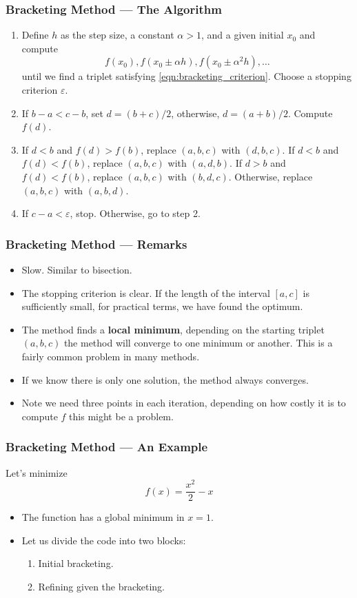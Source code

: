 \documentclass[11pt,xcolor={svgnames},aspectratio=169,usepdftitle=false]{beamer}
\begin{document}
\begin{frame}
  \frametitle{Bracketing Method --- The Algorithm}
\begin{enumerate}
  \item Define $h$ as the step size, a constant $\alpha > 1$, and a given initial $x_0$ and compute
  \[
  f(x_0), f(x_0 \pm \alpha h), f(x_0 \pm \alpha^2 h), \ldots
  \]
  until we find a triplet satisfying \eqref{eqn:bracketing_criterion}. Choose a stopping criterion $\varepsilon$.
  \item If $b - a < c - b$, set $d = (b+c)/2$, otherwise, $d = (a+b) / 2$. Compute $f(d)$.
  \item If $d < b$ and $f(d) > f(b)$, replace $(a,b,c)$ with $(d,b,c)$. If $d<b$ and $f(d) < f(b)$, replace $(a,b,c)$ with $(a,d,b)$. If $d > b$ and $f(d) < f(b)$, replace $(a,b,c)$ with $(b,d,c)$.  Otherwise, replace $(a,b,c)$ with $(a,b,d)$.
  \item If $c - a < \varepsilon$, stop. Otherwise, go to step 2.
\end{enumerate}
\end{frame}

\begin{frame}
  \frametitle{Bracketing Method --- Remarks}
\begin{itemize}
  \item Slow. Similar to bisection.
  \item The stopping criterion is clear. If the length of the interval $[a,c]$ is sufficiently small, for practical terms, we have found the optimum.
  \item The method finds a \alert{\textbf{local minimum}}, depending on the starting triplet $(a,b,c)$ the method will converge to one minimum or another. {\tiny This is a fairly common problem in many methods.}
  \item If we know there is only one solution, the method always converges.
  \item Note we need three points in each iteration, depending on how costly it is to compute $f$ this might be a problem.
\end{itemize}
\end{frame}

\begin{frame}
  \frametitle{Bracketing Method --- An Example}
Let's minimize
\[
f(x) = \frac{x^2}{2} - x
\]
\begin{itemize}
  \item The function has a global minimum in $x = 1$.
  \item Let us divide the code into two blocks:
  \begin{enumerate}
    \item Initial bracketing.
    \item Refining given the bracketing.
  \end{enumerate}
\end{itemize}
\end{frame}
\end{document}
